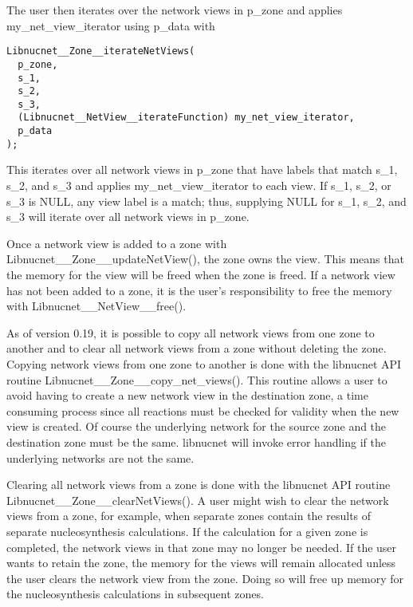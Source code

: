 \documentclass{article}    %
\begin{document}
The user then iterates over the network views in p\_zone and
applies my\_net\_view\_iterator using p\_data with
\begin{verbatim}
Libnucnet__Zone__iterateNetViews(
  p_zone,
  s_1,
  s_2,
  s_3,
  (Libnucnet__NetView__iterateFunction) my_net_view_iterator,
  p_data
);
\end{verbatim}
This iterates over all network views in p\_zone that have labels
that match s\_1, s\_2, and s\_3 and applies my\_net\_view\_iterator
to each view.  If s\_1, s\_2, or s\_3 is NULL, any view label is a match;
thus, supplying NULL for s\_1, s\_2, and s\_3 will iterate over all
network views in p\_zone.

Once a network view is added to a zone with
Libnucnet\_\_Zone\_\_updateNetView(), the zone owns the view.  This
means that the memory for the view will be freed when the zone is freed.
If a network view has not been added to a zone, it is the user's
responsibility to free the memory with Libnucnet\_\_NetView\_\_free().

As of version 0.19, it is possible to copy all network views from one zone to
another and to clear all network views from a zone without deleting the zone.
Copying network views from one zone to another is done with the
libnucnet API routine Libnucnet\_\_Zone\_\_copy\_net\_views().  This routine
allows a user to avoid having
to create a new network view in the destination
zone, a time consuming process since
all reactions must be checked for validity when the new view is created.
Of course the underlying network for the source zone and the destination zone
must be the same.  libnucnet will invoke error handling if the underlying
networks are not the same.

Clearing all network views from a zone
is done with the libnucnet API routine
Libnucnet\_\_Zone\_\_clearNetViews().  A user might wish to clear the
network views from a zone, for example,
when separate zones contain the results of
separate nucleosynthesis calculations.  If the calculation for a given
zone is completed, the network views in that zone may no longer be needed.
If the user wants to retain the zone, the memory for the views will remain
allocated unless the user clears the network view from the zone.
Doing so will free up memory for the nucleosynthesis
calculations in subsequent zones.
\end{document}
